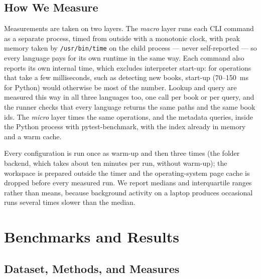 \documentclass[12pt,a4paper]{article}
\begin{document}
	\subsection{How We Measure}

	Measurements are taken on two layers. The \emph{macro} layer runs each CLI command as a
	separate process, timed from outside with a monotonic clock, with peak memory taken by
	\texttt{/usr/bin/time} on the child process --- never self-reported --- so every
	language pays for its own runtime in the same way. Each command also reports its own
	internal time, which excludes interpreter start-up: for operations that take a few
	milliseconds, such as detecting new books, start-up (70--150~ms for Python) would
	otherwise be most of the number. Lookup and query are measured this way in all three
	languages too, one call per book or per query, and the runner checks that every language
	returns the same paths and the same book ids. The \emph{micro} layer times the same
	operations, and the metadata queries, inside the Python process with pytest-benchmark,
	with the index already in memory and a warm cache.

	Every configuration is run once as warm-up and then three times (the folder backend,
	which takes about ten minutes per run, without warm-up); the workspace is
	prepared outside the timer and the operating-system page cache is dropped before every
	measured run. We report medians and interquartile ranges rather than means, because
	background activity on a laptop produces occasional runs several times slower than the
	median.

	\section{Benchmarks and Results}
	\label{sec:benchmarks}
	\subsection{Dataset, Methods, and Measures}
	
\end{document}
